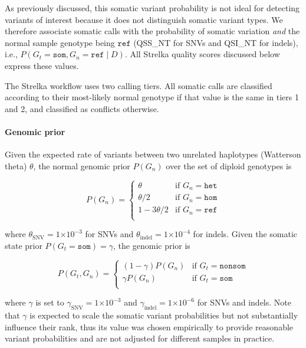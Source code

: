 \documentclass{article}
\newcommand{\e}[1]{\ensuremath{\times 10^{#1}}}
\begin{document}
As previously discussed, this somatic variant probability is not ideal for detecting variants of interest because it does not distinguish somatic variant types. We therefore associate somatic calls with the probability of somatic variation {\em and} the normal sample genotype being $\texttt{ref}$ (QSS\_NT for SNVs and QSI\_NT for indels), i.e., $P(G_t = \texttt{som}, G_n = \texttt{ref} \mid D)$. All Strelka quality scores discussed below express these values.

The Strelka workflow uses two calling tiers. All somatic calls are classified according to their most-likely normal genotype if that value is the same in tiers 1 and 2, and classified as conflicts otherwise.

\paragraph{Genomic prior}
Given the expected rate of variants between two unrelated haplotypes (Watterson theta) $\theta$, the normal genomic prior $P(G_n)$ over the set of diploid genotypes is

\begin{equation*}
P(G_n)=
\begin{cases}
	\theta & \text{if } G_n = \texttt{het} \\
	\theta/2 & \text{if } G_n = \texttt{hom} \\
	1 - 3\theta/2 & \text{if } G_n = \texttt{ref} \\
\end{cases}
\end{equation*}

\noindent where $\theta_{\text{SNV}}=1\e{-3}$ for SNVs and $\theta_{\text{indel}}=1\e{-4}$ for indels. Given the somatic state prior $P(G_t=\texttt{som}) = \gamma$, the genomic prior is

\begin{equation*}
P(G_t, G_n)=
\begin{cases}
	(1 - \gamma) P(G_n) & \text{if } G_t = \texttt{nonsom} \\
	\gamma P(G_n) & \text{if } G_t = \texttt{som} \\
\end{cases}
\end{equation*}

\noindent where $\gamma$ is set to $\gamma_{\text{SNV}} = 1\e{-3}$ and $\gamma_{\text{indel}} = 1\e{-6}$ for SNVs and indels. Note that $\gamma$ is expected to scale the somatic variant probabilities but not substantially influence their rank, thus its value was chosen empirically to provide reasonable variant probabilities and are not adjusted for different samples in practice.
\end{document}
